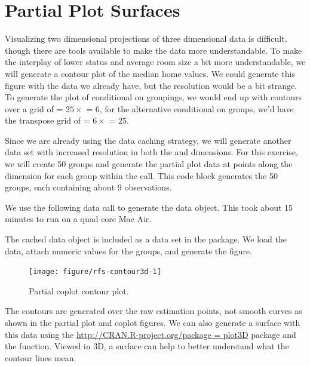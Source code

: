 \documentclass[nojss]{jss}\usepackage[]{graphicx}\usepackage[]{color}
\begin{document}
\section{Partial Plot Surfaces}

Visualizing two dimensional projections of three dimensional data is difficult, though there are tools available to make the data more understandable. To make the interplay of lower status and average room size a bit more understandable, we will generate a contour plot of the median home values. We could generate this figure with the data we already have, but the resolution would be a bit strange. To generate the plot of  conditional on  groupings, we would end up with contours over a grid of  = $25 \times$  = $6$, for the alternative  conditional on  groups, we'd have the transpose grid of  = $6 \times$   = $25$. 

Since we are already using the data caching strategy, we will generate another  data set with increased resolution in both the  and  dimensions. For this exercise, we will create 50  groups and generate the partial plot data at  points along the  dimension for each group within the  call. This code block generates the 50  groups, each containing about 9 observations.     



We use the following data call to generate the  data object. This took about 15 minutes to run on a quad core Mac Air.



The cached  data object is included as a data set in the  package. We load the data, attach numeric values for the  groups, and generate the figure.

\begin{Schunk}
\begin{figure}[!htpb]

{\centering \texttt{[image: figure/rfs-contour3d-1]} 

}

\caption[Partial coplot contour plot]{Partial coplot contour plot.\label{fig:contour3d}}
\end{figure}
\end{Schunk}

The contours are generated over the raw  estimation points, not smooth curves as shown in the partial plot and coplot figures. We can also generate a surface with this data using the  \url{http://CRAN.R-project.org/package = plot3D} package and the  function. Viewed in 3D, a surface can help to better understand what the contour lines mean. 
\end{document}
